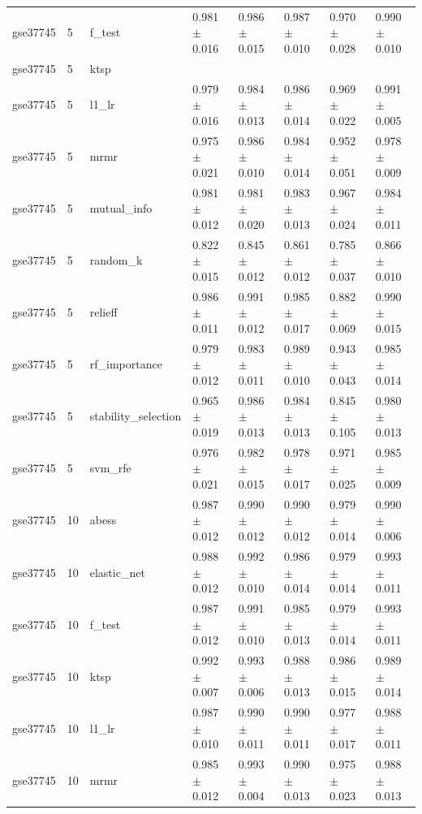 \begin{table}[t]
\begin{tabular}{llllllll}
    gse37745 & 5 & f\_test & 0.981 $\pm$ 0.016 & 0.986 $\pm$ 0.015 & 0.987 $\pm$ 0.010 & 0.970 $\pm$ 0.028 & 0.990 $\pm$ 0.010 \\
    gse37745 & 5 & ktsp &  &  &  &  &  \\
    gse37745 & 5 & l1\_lr & 0.979 $\pm$ 0.016 & 0.984 $\pm$ 0.013 & 0.986 $\pm$ 0.014 & 0.969 $\pm$ 0.022 & 0.991 $\pm$ 0.005 \\
    gse37745 & 5 & mrmr & 0.975 $\pm$ 0.021 & 0.986 $\pm$ 0.010 & 0.984 $\pm$ 0.014 & 0.952 $\pm$ 0.051 & 0.978 $\pm$ 0.009 \\
    gse37745 & 5 & mutual\_info & 0.981 $\pm$ 0.012 & 0.981 $\pm$ 0.020 & 0.983 $\pm$ 0.013 & 0.967 $\pm$ 0.024 & 0.984 $\pm$ 0.011 \\
    gse37745 & 5 & random\_k & 0.822 $\pm$ 0.015 & 0.845 $\pm$ 0.012 & 0.861 $\pm$ 0.012 & 0.785 $\pm$ 0.037 & 0.866 $\pm$ 0.010 \\
    gse37745 & 5 & relieff & 0.986 $\pm$ 0.011 & 0.991 $\pm$ 0.012 & 0.985 $\pm$ 0.017 & 0.882 $\pm$ 0.069 & 0.990 $\pm$ 0.015 \\
    gse37745 & 5 & rf\_importance & 0.979 $\pm$ 0.012 & 0.983 $\pm$ 0.011 & 0.989 $\pm$ 0.010 & 0.943 $\pm$ 0.043 & 0.985 $\pm$ 0.014 \\
    gse37745 & 5 & stability\_selection & 0.965 $\pm$ 0.019 & 0.986 $\pm$ 0.013 & 0.984 $\pm$ 0.013 & 0.845 $\pm$ 0.105 & 0.980 $\pm$ 0.013 \\
    gse37745 & 5 & svm\_rfe & 0.976 $\pm$ 0.021 & 0.982 $\pm$ 0.015 & 0.978 $\pm$ 0.017 & 0.971 $\pm$ 0.025 & 0.985 $\pm$ 0.009 \\
    gse37745 & 10 & abess & 0.987 $\pm$ 0.012 & 0.990 $\pm$ 0.012 & 0.990 $\pm$ 0.012 & 0.979 $\pm$ 0.014 & 0.990 $\pm$ 0.006 \\
    gse37745 & 10 & elastic\_net & 0.988 $\pm$ 0.012 & 0.992 $\pm$ 0.010 & 0.986 $\pm$ 0.014 & 0.979 $\pm$ 0.014 & 0.993 $\pm$ 0.011 \\
    gse37745 & 10 & f\_test & 0.987 $\pm$ 0.012 & 0.991 $\pm$ 0.010 & 0.985 $\pm$ 0.013 & 0.979 $\pm$ 0.014 & 0.993 $\pm$ 0.011 \\
    gse37745 & 10 & ktsp & 0.992 $\pm$ 0.007 & 0.993 $\pm$ 0.006 & 0.988 $\pm$ 0.013 & 0.986 $\pm$ 0.015 & 0.989 $\pm$ 0.014 \\
    gse37745 & 10 & l1\_lr & 0.987 $\pm$ 0.010 & 0.990 $\pm$ 0.011 & 0.990 $\pm$ 0.011 & 0.977 $\pm$ 0.017 & 0.988 $\pm$ 0.011 \\
    gse37745 & 10 & mrmr & 0.985 $\pm$ 0.012 & 0.993 $\pm$ 0.004 & 0.990 $\pm$ 0.013 & 0.975 $\pm$ 0.023 & 0.988 $\pm$ 0.013 \\

\end{tabular}
\end{table}
